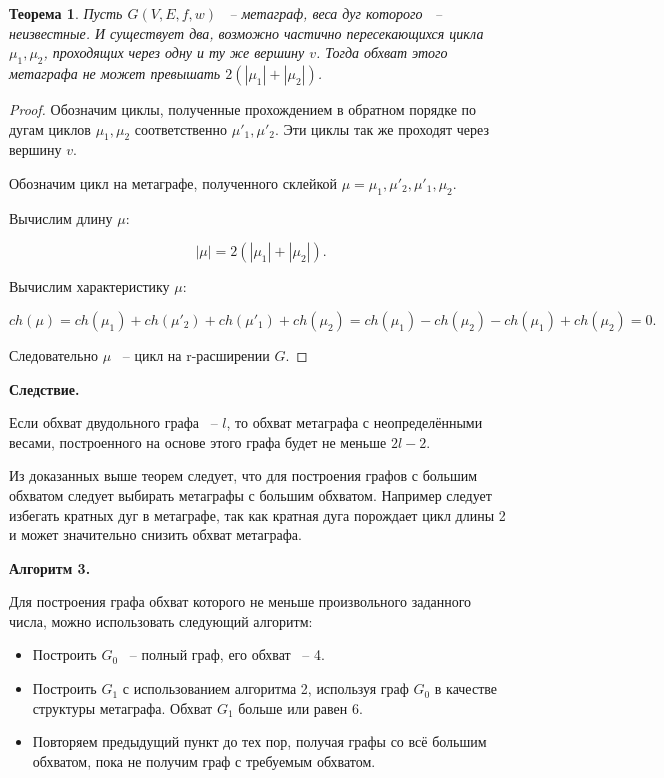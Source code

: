 \documentclass[14pt]{mmcs-article}
\newtheorem{theorem}{Теорема}
\begin{document}
\begin{theorem}

    Пусть $G(V, E, f, w)$ ~-- метаграф, веса дуг которого ~-- неизвестные. И существует два, возможно частично пересекающихся цикла $\mu_1, \mu_2$, проходящих через одну и ту же вершину $v$. Тогда обхват этого метаграфа не может превышать $2(|\mu_1| + |\mu_2|)$.

\end{theorem}
    
\begin{proof}
    
    Обозначим циклы, полученные прохождением в обратном порядке по дугам циклов $\mu_1, \mu_2$ соответственно $\mu'_1, \mu'_2$. Эти циклы так же проходят через вершину $v$.
    
    Обозначим цикл на метаграфе, полученного склейкой $\mu = \mu_1, \mu'_2, \mu'_1, \mu_2$.

    Вычислим длину $\mu$:
    
    \[
        |\mu| = 2(|\mu_1| + |\mu_2|).
    \]

    Вычислим характеристику $\mu$: 
    
    \[
        ch(\mu)  = ch(\mu_1) + ch(\mu'_2) + ch(\mu'_1) + ch(\mu_2)
                 = ch(\mu_1) - ch(\mu_2) - ch(\mu_1) + ch(\mu_2)
                 = 0.
    \]

    Следовательно $\mu$ ~-- цикл на r-расширении $G$.
    
\end{proof}

\textbf{Следствие.}

Если обхват двудольного графа ~-- $l$, то обхват метаграфа с неопределёнными весами, построенного на основе этого графа будет не меньше $2l - 2$. 

Из доказанных выше теорем следует, что для построения графов с большим обхватом следует выбирать метаграфы с большим обхватом. Например следует избегать кратных дуг в метаграфе, так как кратная дуга порождает цикл длины 2 и может значительно снизить обхват метаграфа.

\textbf{Алгоритм 3.}

Для построения графа обхват которого не меньше произвольного заданного числа, можно использовать следующий алгоритм:

\begin{itemize}
    \item Построить $G_0$ ~-- полный граф, его обхват ~-- 4.
    \item Построить $G_1$ с использованием алгоритма 2, используя граф $G_0$ в качестве структуры метаграфа. Обхват $G_1$ больше или равен 6.
    \item Повторяем предыдущий пункт до тех пор, получая графы со всё большим обхватом, пока не получим граф с требуемым обхватом.  
\end{itemize}
\end{document}
